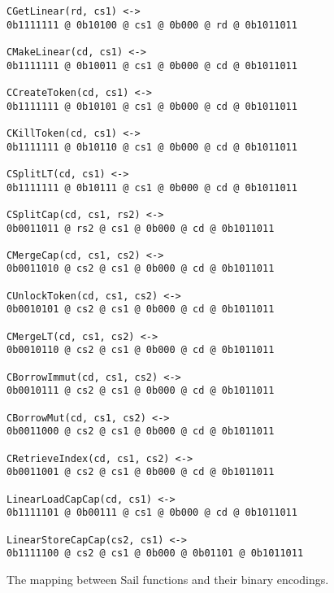 \begin{figure}[ht]
\begin{verbatim}
CGetLinear(rd, cs1) <->
0b1111111 @ 0b10100 @ cs1 @ 0b000 @ rd @ 0b1011011

CMakeLinear(cd, cs1) <->
0b1111111 @ 0b10011 @ cs1 @ 0b000 @ cd @ 0b1011011

CCreateToken(cd, cs1) <->
0b1111111 @ 0b10101 @ cs1 @ 0b000 @ cd @ 0b1011011

CKillToken(cd, cs1) <->
0b1111111 @ 0b10110 @ cs1 @ 0b000 @ cd @ 0b1011011

CSplitLT(cd, cs1) <->
0b1111111 @ 0b10111 @ cs1 @ 0b000 @ cd @ 0b1011011

CSplitCap(cd, cs1, rs2) <->
0b0011011 @ rs2 @ cs1 @ 0b000 @ cd @ 0b1011011

CMergeCap(cd, cs1, cs2) <->
0b0011010 @ cs2 @ cs1 @ 0b000 @ cd @ 0b1011011

CUnlockToken(cd, cs1, cs2) <->
0b0010101 @ cs2 @ cs1 @ 0b000 @ cd @ 0b1011011

CMergeLT(cd, cs1, cs2) <->
0b0010110 @ cs2 @ cs1 @ 0b000 @ cd @ 0b1011011

CBorrowImmut(cd, cs1, cs2) <->
0b0010111 @ cs2 @ cs1 @ 0b000 @ cd @ 0b1011011

CBorrowMut(cd, cs1, cs2) <->
0b0011000 @ cs2 @ cs1 @ 0b000 @ cd @ 0b1011011

CRetrieveIndex(cd, cs1, cs2) <->
0b0011001 @ cs2 @ cs1 @ 0b000 @ cd @ 0b1011011

LinearLoadCapCap(cd, cs1) <->
0b1111101 @ 0b00111 @ cs1 @ 0b000 @ cd @ 0b1011011

LinearStoreCapCap(cs2, cs1) <->
0b1111100 @ cs2 @ cs1 @ 0b000 @ 0b01101 @ 0b1011011

\end{verbatim}
\caption{The mapping between Sail functions and their binary encodings.}
\label{code:instencodings}
\end{figure}

